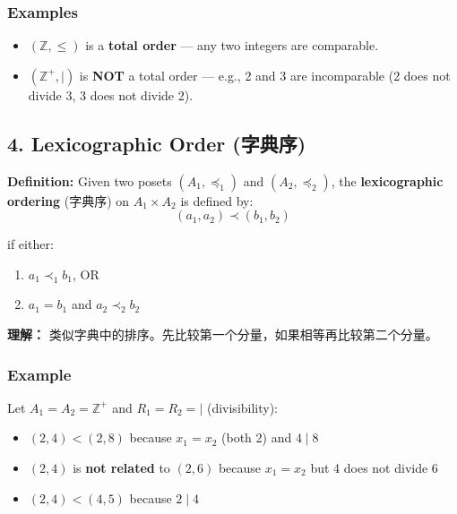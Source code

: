 \documentclass[10pt,a4paper,openany]{ctexbook}
\theoremstyle{definition}
\theoremstyle{remark}
\renewenvironment{quote}
  {\list{}{\leftmargin=1em\rightmargin=0pt\topsep=0.5pt\partopsep=0pt}\item[]}
  {\endlist}
\begin{document}
\subsubsection{Examples}

\begin{itemize}
\item $(\mathbb{Z}, \le)$ is a \textbf{total order} — any two integers are comparable.
\item $(\mathbb{Z}^+, \mid)$ is \textbf{NOT} a total order — e.g., 2 and 3 are incomparable (2 does not divide 3, 3 does not divide 2).

\end{itemize}

\vspace{-2pt}

\subsection{4. Lexicographic Order (字典序)}

\textbf{Definition:} Given two posets $(A_1, \preccurlyeq_1)$ and $(A_2, \preccurlyeq_2)$, the \textbf{lexicographic ordering} (字典序) on $A_1 \times A_2$ is defined by:
\[
(a_1, a_2) \prec (b_1, b_2)
\]

if either:
\begin{enumerate}
\item $a_1 \prec_1 b_1$, OR
\item $a_1 = b_1$ and $a_2 \prec_2 b_2$

\end{enumerate}

\begin{quote}
\textbf{理解：} 类似字典中的排序。先比较第一个分量，如果相等再比较第二个分量。

\end{quote}

\subsubsection{Example}

Let $A_1 = A_2 = \mathbb{Z}^+$ and $R_1 = R_2 = \mid$ (divisibility):
\begin{itemize}
\item $(2, 4) < (2, 8)$ because $x_1 = x_2$ (both 2) and $4 \mid 8$
\item $(2, 4)$ is \textbf{not related} to $(2, 6)$ because $x_1 = x_2$ but 4 does not divide 6
\item $(2, 4) < (4, 5)$ because $2 \mid 4$

\end{itemize}
\end{document}
